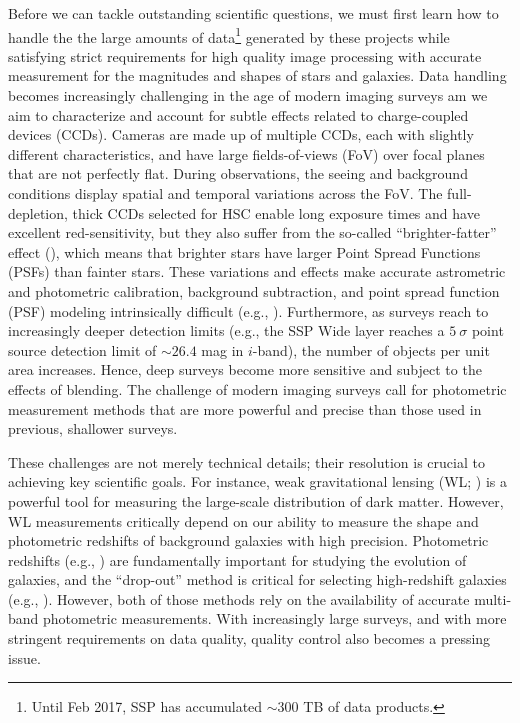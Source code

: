 \documentclass[useamsfonts]{pasj01}
\begin{document}
    Before we can tackle outstanding scientific questions, we must first learn
    how to handle the the large amounts of data\footnote{Until Feb 2017, SSP has 
    accumulated ${\sim}300$ TB of data products.} generated by these projects while 
    satisfying strict requirements for high quality image processing with accurate 
    measurement for the magnitudes and shapes of stars and galaxies. 
    Data handling becomes increasingly challenging in the age of modern imaging
    surveys am we aim to characterize and account for subtle effects related to 
    charge-coupled devices (CCDs). 
    Cameras are made up of multiple CCDs, each with slightly different
    characteristics, and have large fields-of-views (FoV) over focal planes that 
    are not perfectly flat. 
    During observations, the seeing and background conditions display spatial and 
    temporal variations across the FoV. 
    The full-depletion, thick CCDs selected for HSC enable long exposure
    times and have excellent red-sensitivity, but they also suffer from the
    so-called ``brighter-fatter'' effect (\citealt{Antilogus2014, Guyonnet2015}), 
    which means that brighter stars have larger Point Spread Functions (PSFs) than 
    fainter stars. 
    These variations and effects make accurate astrometric and photometric calibration,
    background subtraction, and point spread function (PSF) modeling intrinsically
    difficult (e.g., \citealt{Schlafly2012}). 
    Furthermore, as surveys reach to increasingly deeper detection limits
    (e.g., the SSP Wide layer reaches a $5\ \sigma$ point source detection limit of
    ${\sim}26.4$ mag in $i$-band), the number of objects per unit area increases.  
    Hence, deep surveys become more sensitive and subject to the effects of blending.  
    The challenge of modern imaging surveys call for  photometric measurement methods
    that are more powerful and precise than those used in previous, shallower surveys.
    
    These challenges are not merely technical details; their resolution is crucial
    to achieving key scientific goals.
    For instance, weak gravitational lensing (WL; \citealt{Kaiser1993, Bartelmann2001})
    is a powerful tool for measuring the large-scale distribution of dark matter.
    However, WL measurements critically depend on our ability to measure the shape and 
    photometric redshifts of background galaxies with high precision. 
    Photometric redshifts (e.g., \citealt{Benitez2000, Bolzonella2000, Ilbert2009}) are 
    fundamentally important for studying the evolution of galaxies, and the ``drop-out'' 
    method is critical for selecting high-redshift galaxies 
    (e.g., \citealt{Steidel1996}).
    However, both of those methods rely on the availability of accurate multi-band 
    photometric measurements. 
    With increasingly large surveys, and with more stringent requirements on data 
    quality, quality control also becomes a pressing issue. 
    
\end{document}
